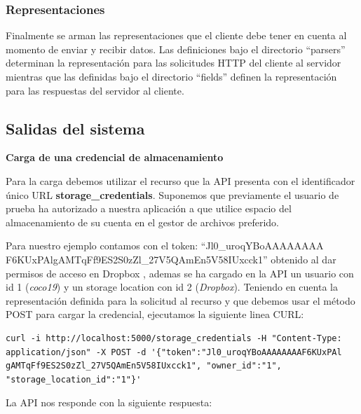 \subsubsection{Representaciones}
Finalmente se arman las representaciones que el cliente debe tener en cuenta al momento de enviar y recibir datos. Las definiciones bajo el directorio ``parsers'' determinan la representación para las solicitudes HTTP del cliente al servidor mientras que las definidas bajo el directorio ``fields'' definen la representación para las respuestas del servidor al cliente.





\subsection {Salidas del sistema}
\textbf{Carga de una credencial de almacenamiento}

Para la carga debemos utilizar el recurso que la API presenta con el identificador único URL \textbf{\/storage\_credentials}. Suponemos que previamente el usuario de prueba ha autorizado a nuestra aplicación a que utilice espacio del almacenamiento de su cuenta en el gestor de archivos preferido.

Para nuestro ejemplo contamos con el token: ``Jl0\_uroqYBoAAAAAAAA
F6KUxPAlgAMTqFf9ES2S0zZl\_27V5QAmEn5V58IUxcck1'' obtenido al dar permisos de acceso en Dropbox , ademas se ha cargado en la API un usuario con id 1 (\textit{coco19}) y un storage location con id 2 (\textit{Dropbox}). Teniendo en cuenta la representación definida para la solicitud al recurso y que debemos usar el método POST para cargar la credencial, ejecutamos la siguiente linea CURL:

\begin{verbatim}
curl -i http://localhost:5000/storage_credentials -H "Content-Type: 
application/json" -X POST -d '{"token":"Jl0_uroqYBoAAAAAAAAF6KUxPAl
gAMTqFf9ES2S0zZl_27V5QAmEn5V58IUxcck1", "owner_id":"1", 
"storage_location_id":"1"}'
\end{verbatim}

La API nos responde con la siguiente respuesta:


